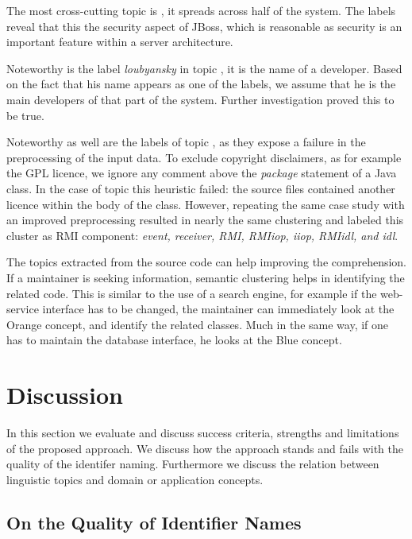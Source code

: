 The most cross-cutting topic is \yellow, it spreads across half of the system. The labels reveal that this the security aspect of JBoss, which is reasonable as security is an important feature within a server architecture.

Noteworthy is the label \emph{loubyansky} in topic \blue, it is the name of a developer. Based on the fact that his name appears as one of the labels, we assume that he is the main developers of that part of the system. Further investigation proved this to be true.

Noteworthy as well are the labels of topic \darkgreen, as they expose a failure in the preprocessing of the input data. To exclude copyright disclaimers, as for example the GPL licence, we ignore any comment above the \emph{package} statement of a Java class. In the case of topic \darkgreen this heuristic failed: the source files contained another licence within the body of the class. However, repeating the same case study with an improved preprocessing resulted in nearly the same clustering and labeled this cluster as RMI component: \emph{event, receiver, RMI, RMIiop, iiop, RMIidl, and idl}.

The topics extracted from the source code can help improving the comprehension. If a maintainer is seeking information, semantic clustering helps in identifying the related code. This is similar to the use of a search engine, for example if the web-service interface has to be changed, the maintainer can immediately look at the Orange concept, and identify the related classes. Much in the same way, if one has to maintain the database interface, he looks at the Blue concept.


\section{Discussion}\label{sec:discussion}


In this section we evaluate and discuss success criteria, strengths and limitations of the proposed approach. We discuss how the approach stands and fails with the quality of the identifer naming. Furthermore we discuss the relation between linguistic topics and domain or application concepts.

\subsection{On the Quality of Identifier Names}

